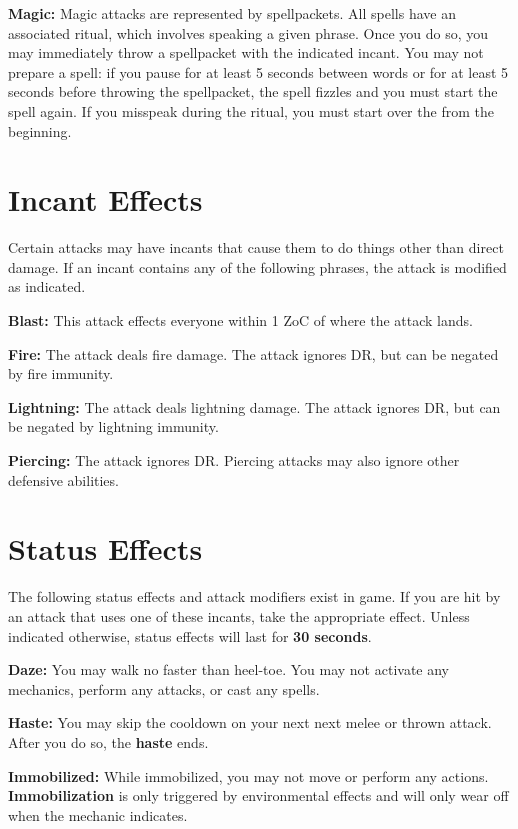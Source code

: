 \documentclass[green]{grimrock}
\begin{document}
{\bf Magic:}  Magic attacks are represented by spellpackets.  All spells have an associated ritual, which involves speaking a given phrase.  Once you do so, you may immediately throw a spellpacket with the indicated incant.  You may not prepare a spell: if you pause for at least 5 seconds between words or for at least 5 seconds before throwing the spellpacket, the spell fizzles and you must start the spell again.  If you misspeak during the ritual, you must start over the from the beginning.

\section{Incant Effects}

Certain attacks may have incants that cause them to do things other than direct damage.  If an incant contains any of the following phrases, the attack is modified as indicated.

{\bf Blast:} This attack effects everyone within 1 ZoC of where the attack lands.

{\bf Fire:} The attack deals fire damage.  The attack ignores DR, but can be negated by fire immunity.

{\bf Lightning:} The attack deals lightning damage.  The attack ignores DR, but can be negated by lightning immunity.

{\bf Piercing:} The attack ignores DR.  Piercing attacks may also ignore other defensive abilities.


\section{Status Effects}

The following status effects and attack modifiers exist in game.  If you are hit by an attack that uses one of these incants, take the appropriate effect.  Unless indicated otherwise, status effects will last for {\bf 30 seconds}.

{\bf Daze:} You may walk no faster than heel-toe.  You may not activate any mechanics, perform any attacks, or cast any spells.


{\bf Haste:} You may skip the cooldown on your next next melee or thrown attack.  After you do so, the {\bf haste} ends.

{\bf Immobilized:}  While immobilized, you may not move or perform any actions.  {\bf Immobilization} is only triggered by environmental effects and will only wear off when the mechanic indicates.
\end{document}
